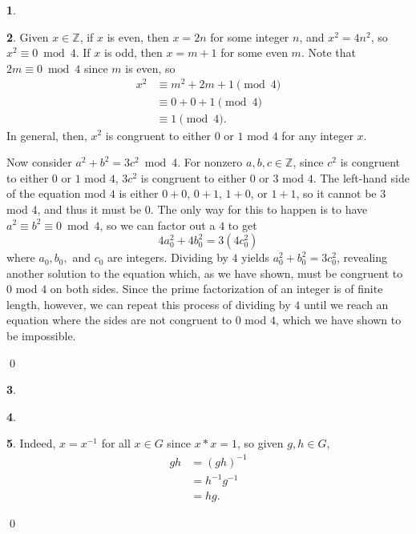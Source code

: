 \documentclass[12pt]{article}
\theoremstyle{definition}
\newtheorem{ex}{}
\begin{document}
\begin{ex}

\end{ex}

\begin{ex}
	Given $x \in \mathbb{Z}$, if $x$ is even, then $x = 2n$ for some integer $n$, and $x^2 = 4n^2$, so $x^2 \equiv 0 \bmod 4$.
	If $x$ is odd, then $x = m + 1$ for some even $m$.
	Note that $2m \equiv 0 \bmod 4$ since $m$ is even, so \begin{align*}
		x^2 & \equiv m^2 + 2m + 1 \pmod 4 \\
		    & \equiv 0 + 0 + 1 \pmod 4    \\
		    & \equiv 1 \pmod 4.
	\end{align*}
	In general, then, $x^2$ is congruent to either $0$ or $1$ mod $4$ for any integer $x$.

	Now consider $a^2 + b^2 = 3c^2 \bmod 4$.
	For nonzero $a, b, c \in \mathbb{Z}$, since $c^2$ is congruent to either $0$ or $1$ mod $4$, $3c^2$ is congruent to either $0$ or $3$ mod $4$.
	The left-hand side of the equation mod $4$ is either $0 + 0$, $0 + 1$, $1 + 0$, or $1 + 1$, so it cannot be $3$ mod $4$, and thus it must be $0$.
	The only way for this to happen is to have $a^2 \equiv b^2 \equiv 0 \bmod 4$, so we can factor out a $4$ to get \begin{equation*}
		4a_0^2 + 4b_0^2 = 3(4c_0^2)
	\end{equation*}
	where $a_0, b_0,$ and $c_0$ are integers.
	Dividing by $4$ yields $a_0^2 + b_0^2 = 3c_0^2$, revealing another solution to the equation which, as we have shown, must be congruent to $0$ mod $4$ on both sides.
	Since the prime factorization of an integer is of finite length, however, we can repeat this process of dividing by $4$ until we reach an equation where the sides are not congruent to $0$ mod $4$, which we have shown to be impossible.

	\qed
\end{ex}

\begin{ex}

\end{ex}

\begin{ex}

\end{ex}

\begin{ex}
	Indeed, $x = x^{-1}$ for all $x \in G$ since $x * x = 1$, so given $g, h \in G$, \begin{align*}
		gh & = (gh)^{-1}    \\
		   & = h^{-1}g^{-1} \\
		   & = hg.
	\end{align*}

	\qed
\end{ex}
\end{document}
